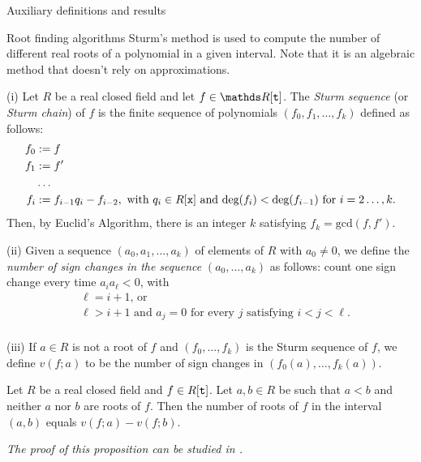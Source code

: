 \documentclass[11pt, a4paper, english, twoside, notitlepage, openright]{report}
\begin{document}
\begin{chapter}{Auxiliary definitions and results}
\begin{section}{Root finding algorithms}
Sturm's method is used to compute the number of different real roots of a polynomial in a given interval. Note that it is an algebraic method that doesn't rely on approximations.

\begin{definitions}\label{sturmSeq} (i) Let $R$ be a real closed field and let $f\in\R[{\tt t}]$. The \emph{Sturm sequence} (or \emph{Sturm chain}) of $f$ is the finite sequence of polynomials $(f_0,f_1,\dots,f_k)$ defined as follows: 
\begin{equation*}
\begin{aligned}
f_0&:=f\\
f_1&:=f'\\
&\dots\\
f_i&:=f_{i-1}q_i-f_{i-2}, \text{ with }q_{i}\in R[{\tt x}] \text{ and } \text{deg}(f_{i})<\text{deg}(f_{i-1}) \text{ for } i=2\dots,k.\\
\end{aligned}
\end{equation*}
Then, by Euclid's Algorithm, there is an integer $k$ satisfying $f_k=\text{gcd}(f,f')$.
	
(ii) Given a sequence $(a_0, a_1, \dots, a_k)$ of elements of $R$ with $a_0 \ne 0$, we define the \emph{number of sign changes in the sequence} $(a_0, \dots, a_k)$ as follows: count one sign change every time $a_ia_{\ell} < 0$, with 
\begin{equation*}
\begin{aligned}
&\ell=i+1 \text{, or }\\
&\ell>i+1 \text{ and }a_j=0 \text{ for every } j \text{ satisfying  } i<j<\ell.\\ 
\end{aligned}
\end{equation*}

(iii) If $a\in R$ is not a root of $f$ and $(f_0,\dots,f_k)$ is the Sturm sequence of $f$, we define $v(f;a)$ to be the number of sign changes in $(f_0(a),\dots,f_k(a))$.
\end{definitions}
\begin{proposition}\label{sturm} 
Let $R$ be a real closed field and $f\in R[{\tt t}]$. Let $a,b\in R$ be such that $a<b$ and neither $a$ nor $b$ are roots of $f$. Then the number of roots of $f$ in the interval $(a,b)$ equals $v(f;a)-v(f;b)$.

\em The proof of this proposition can be studied in \cite[1.2.10]{bcr}. \em
\end{proposition}


\end{section}
\end{chapter}
\end{document}
